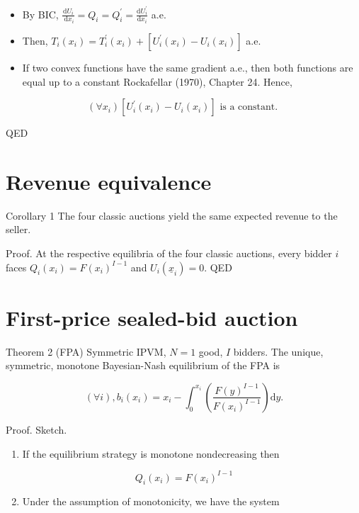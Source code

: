 \documentclass[10pt]{article}
\begin{document}
\begin{itemize}
  \item By BIC, $\frac{\mathrm{d} U_{i}}{\mathrm{~d} x_{i}}=Q_{i}=Q_{i}^{\prime}=\frac{\mathrm{d} U_{i}^{\prime}}{\mathrm{d} x_{i}}$ a.e.
  \item Then, $T_{i}\left(x_{i}\right)=T_{i}^{\prime}\left(x_{i}\right)+\left[U_{i}^{\prime}\left(x_{i}\right)-U_{i}\left(x_{i}\right)\right]$ a.e.
  \item If two convex functions have the same gradient a.e., then both functions are equal up to a constant Rockafellar (1970), Chapter 24. Hence,
\end{itemize}

$$
\left(\forall x_{i}\right)\left[U_{i}^{\prime}\left(x_{i}\right)-U_{i}\left(x_{i}\right)\right] \text { is a constant. }
$$

QED

\section*{Revenue equivalence}
Corollary 1 The four classic auctions yield the same expected revenue to the seller.

Proof. At the respective equilibria of the four classic auctions, every bidder $i$ faces $Q_{i}\left(x_{i}\right)=F\left(x_{i}\right)^{I-1}$ and $U_{i}\left(\underline{x}_{i}\right)=0$. QED

\section*{First-price sealed-bid auction}
Theorem 2 (FPA) Symmetric IPVM, $N=1$ good, $I$ bidders. The unique, symmetric, monotone Bayesian-Nash equilibrium of the FPA is

$$
(\forall i), b_{i}\left(x_{i}\right)=x_{i}-\int_{0}^{x_{i}}\left(\frac{F(y)^{I-1}}{F\left(x_{i}\right)^{I-1}}\right) \mathrm{d} y .
$$

Proof. Sketch.

\begin{enumerate}
  \item If the equilibrium strategy is monotone nondecreasing then
\end{enumerate}

$$
Q_{i}\left(x_{i}\right)=F\left(x_{i}\right)^{I-1}
$$

\begin{enumerate}
  \setcounter{enumi}{1}
  \item Under the assumption of monotonicity, we have the system
\end{enumerate}
\end{document}
